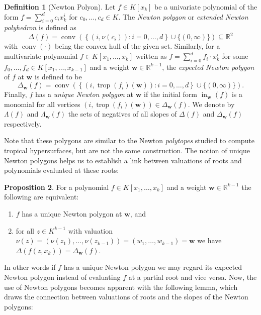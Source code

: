 \documentclass[
  paper=a4,
  titlepage,
  bibliography=totoc,
  pagesize=pdftex
]{scrartcl}
\numberwithin{figure}{section}
\numberwithin{equation}{section}
\numberwithin{table}{section}
\newcommand*\setR{\mathds{R}}
\let\vec\mathbf
\DeclareMathOperator{\trop}{trop}
\DeclareMathOperator{\initial}{in}
\DeclareMathOperator{\conv}{conv}
\theoremstyle{definition}
\newtheorem{definition}{Definition}
\newtheorem{proposition}[definition]{Proposition}
\numberwithin{definition}{section}
\begin{document}
\begin{definition}[Newton Polyon]
  Let $f \in K[x_k]$ be a univariate polynomial of the form $f = \sum_{i=0}^d c_i x_k^i$
  for $c_0, \dots, c_d \in K$. The \emph{Newton polygon} or \emph{extended Newton
  polyhedron} is defined as
  \[
    \Delta(f) = \conv \left(
      \left\{ (i, \nu(c_i)) : i = 0, \dots, d \right\}
      \cup \{ (0, \infty) \}
    \right)
    \subseteq \setR^2
  \]
  with $\conv(\cdot)$ being the convex hull of the given set. Similarly, for a
  multivariate polynomial $f \in K[x_1, \dots, x_k]$ written as $f = \sum_{i=0}^d f_i
  \cdot x_k^i$ for some $f_0, \dots, f_d \in K[x_1, \dots, x_{k-1}]$ and a weight $\vec w
  \in \setR^{k-1}$, the \emph{expected Newton polygon} of $f$ at $\vec w$ is defined to be
  \[
    \Delta_{\vec w}(f) = \conv\left(
      \left\{ (i, \trop(f_i)(\vec w)) : i = 0, \dots, d \right\}
      \cup \{ (0, \infty) \}
    \right).
  \]
  Finally, $f$ has a \emph{unique Newton polygon} at $\vec w$ if the initial form
  $\initial_{\vec w}(f)$ is a monomial for all vertices $(i, \trop(f_i)(\vec w)) \in
  \Delta_{\vec w}(f)$. We denote by $\Lambda(f)$ and $\Lambda_{\vec w}(f)$ the sets of
  negatives of all slopes of $\Delta(f)$ and $\Delta_{\vec w}(f)$ respectively.
  \label{def:newtonPoly}
\end{definition}

Note that these polygons are similar to the Newton \emph{polytopes} studied to compute
tropical hypersurfaces, but are not the same construction. The notion of unique Newton
polygons helps us to establish a link between valuations of roots and polynomials
evaluated at these roots:

\begin{proposition}
  \label{prp:expectedNewt}
  For a polynomial $f \in K[x_1, \dots, x_k]$ and a weight $\vec w \in \setR^{k-1}$ the
  following are equivalent:
  \begin{enumerate}
    \item $f$ has a unique Newton polygon at $\vec w$, and
    \item for all $z \in K^{k-1}$ with valuation $\nu(z) = (\nu(z_1), \dots, \nu(z_{k-1}))
      = (w_1, \dots, w_{k-1}) = \vec w$ we have $\Delta(f(z, x_k)) = \Delta_{\vec w}(f)$.
  \end{enumerate}
\end{proposition}

In other words if $f$ has a unique Newton polygon we may regard its expected Newton
polygon instead of evaluating $f$ at a partial root and vice versa. Now, the use of Newton
polygons becomes apparent with the following lemma, which draws the connection between
valuations of roots and the slopes of the Newton polygons:
\end{document}
